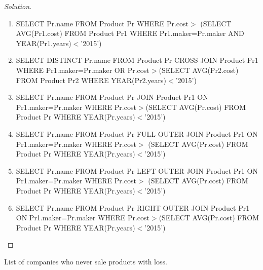 \documentclass[10pt,a4paper]{article}
\newenvironment{problem}[2][Problem]{\begin{trivlist}
\item[\hskip \labelsep {\bfseries #1}\hskip \labelsep {\bfseries #2.}]}{\end{trivlist}}
\begin{document}
\begin{proof}[Solution]
\begin{enumerate}
	\item SELECT Pr.name FROM Product Pr WHERE Pr.cost$>$ (SELECT  AVG(Pr1.cost) FROM Product Pr1 WHERE Pr1.maker=Pr.maker AND YEAR(Pr1.years)$<$'2015')
	\item SELECT DISTINCT Pr.name FROM Product Pr CROSS JOIN Product Pr1
WHERE Pr1.maker=Pr.maker OR  Pr.cost$>$(SELECT  AVG(Pr2.cost) FROM Product Pr2 WHERE YEAR(Pr2.years)$<$'2015') 
	\item SELECT  Pr.name FROM Product Pr JOIN Product Pr1 ON Pr1.maker=Pr.maker WHERE Pr.cost$>$(SELECT  AVG(Pr.cost) FROM Product Pr WHERE YEAR(Pr.years)$<$'2015')
	\item SELECT  Pr.name FROM Product Pr FULL OUTER JOIN Product Pr1
ON Pr1.maker=Pr.maker WHERE Pr.cost$>$ (SELECT  AVG(Pr.cost) FROM Product Pr	WHERE YEAR(Pr.years)$<$'2015')
	\item SELECT  Pr.name FROM Product Pr LEFT OUTER JOIN Product Pr1
ON Pr1.maker=Pr.maker WHERE Pr.cost$>$ (SELECT  AVG(Pr.cost) FROM Product Pr	WHERE YEAR(Pr.years)$<$'2015')
	\item SELECT  Pr.name FROM Product Pr RIGHT OUTER JOIN Product Pr1
ON Pr1.maker=Pr.maker WHERE Pr.cost$>$(SELECT  AVG(Pr.cost) FROM Product Pr	WHERE YEAR(Pr.years)$<$'2015')
\end{enumerate}
\end{proof}

\begin{problem}{9}
List of companies who never sale products with loss.
\end{problem}
\end{document}
